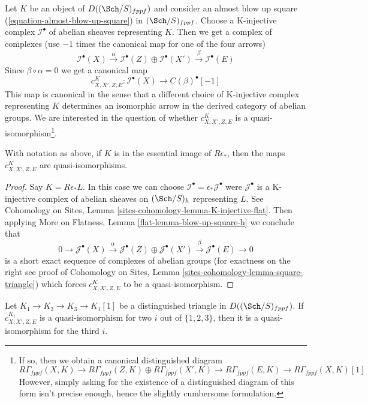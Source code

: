 \medskip\noindent
Let $K$ be an object of $D((\Sch/S)_{fppf})$ and consider an almost
blow up square (\ref{equation-almost-blow-up-square}) in $(\Sch/S)_{fppf}$.
Choose a K-injective complex $\mathcal{I}^\bullet$ of abelian sheaves
representing $K$. Then we get a complex of complexes
(use $-1$ times the canonical map for one of the four arrows)
$$
\mathcal{I}^\bullet(X) \xrightarrow{\alpha}
\mathcal{I}^\bullet(Z) \oplus
\mathcal{I}^\bullet(X') \xrightarrow{\beta}
\mathcal{I}^\bullet(E)
$$
Since $\beta \circ \alpha = 0$ we get a canonical map
$$
c^K_{X, X', Z, E} : \mathcal{I}^\bullet(X) \longrightarrow C(\beta)^\bullet[-1]
$$
This map is canonical in the sense that a different choice
of K-injective complex representing $K$ determines an isomorphic
arrow in the derived category of abelian groups.
We are interested in the question of whether
$c^K_{X, X', Z, E}$ is a quasi-isomorphism\footnote{If so, then
we obtain a canonical distinguished diagram
$$
R\Gamma_{fppf}(X, K) \to
R\Gamma_{fppf}(Z, K) \oplus
R\Gamma_{fppf}(X', K) \to
R\Gamma_{fppf}(E, K) \to
R\Gamma_{fppf}(X, K)[1]
$$
However, simply asking for the existence of a distinguished diagram
of this form isn't precise enough, hence the slightly cumbersome
formulation.}.

\begin{lemma}
\label{lemma-blow-up-square-h}
With notation as above, if $K$ is in the essential image
of $R\epsilon_*$, then the maps $c^K_{X, X', Z, E}$
are quasi-isomorphisms.
\end{lemma}

\begin{proof}
Say $K = R\epsilon_*L$. In this case we can choose
$\mathcal{I}^\bullet = \epsilon_*\mathcal{J}^\bullet$
were $\mathcal{J}^\bullet$ is a K-injective complex of abelian
sheaves on $(\Sch/S)_h$ representing $L$. See
Cohomology on Sites, Lemma \ref{sites-cohomology-lemma-K-injective-flat}.
Then applying More on Flatness, Lemma \ref{flat-lemma-blow-up-square-h}
we conclude that
$$
0 \to
\mathcal{J}^\bullet(X) \xrightarrow{\alpha}
\mathcal{J}^\bullet(Z) \oplus
\mathcal{J}^\bullet(X') \xrightarrow{\beta}
\mathcal{J}^\bullet(E)
\to 0
$$
is a short exact sequence of complexes of abelian groups
(for exactness on the right see proof of
Cohomology on Sites, Lemma \ref{sites-cohomology-lemma-square-triangle})
which forces $c^K_{X, X', Z, E}$ to be a quasi-isomorphism.
\end{proof}

\begin{lemma}
\label{lemma-two-out-of-three-blow-up-square}
Let $K_1 \to K_2 \to K_3 \to K_1[1]$ be a distinguished
triangle in $D((\Sch/S)_{fppf})$.
If $c^{K_i}_{X, X', Z, E}$ is a quasi-isomorphism for
two $i$ out of $\{1, 2, 3\}$, then it is a quasi-isomorphism
for the third $i$.
\end{lemma}

